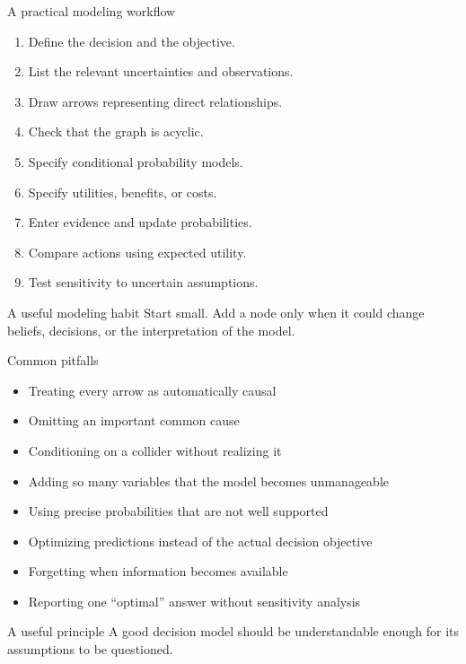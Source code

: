 \documentclass[aspectratio=43,11pt]{beamer}
\begin{document}
\begin{frame}{A practical modeling workflow}

\begin{enumerate}
  \item Define the decision and the objective.
  \item List the relevant uncertainties and observations.
  \item Draw arrows representing direct relationships.
  \item Check that the graph is acyclic.
  \item Specify conditional probability models.
  \item Specify utilities, benefits, or costs.
  \item Enter evidence and update probabilities.
  \item Compare actions using expected utility.
  \item Test sensitivity to uncertain assumptions.
\end{enumerate}

\medskip

\begin{alertblock}{A useful modeling habit}
Start small. Add a node only when it could change beliefs, decisions,
or the interpretation of the model.
\end{alertblock}

\end{frame}

\begin{frame}{Common pitfalls}

\begin{itemize}
  \item Treating every arrow as automatically causal
  \item Omitting an important common cause
  \item Conditioning on a collider without realizing it
  \item Adding so many variables that the model becomes unmanageable
  \item Using precise probabilities that are not well supported
  \item Optimizing predictions instead of the actual decision objective
  \item Forgetting when information becomes available
  \item Reporting one ``optimal'' answer without sensitivity analysis
\end{itemize}

\medskip

\begin{block}{A useful principle}
A good decision model should be understandable enough for its
assumptions to be questioned.
\end{block}

\end{frame}
\end{document}
